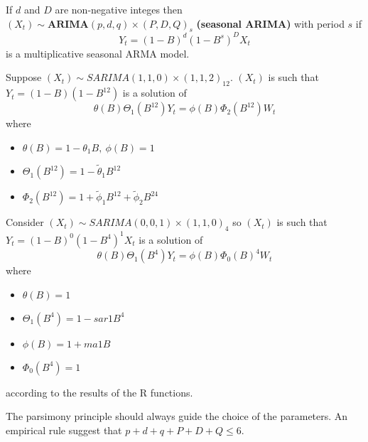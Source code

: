 \begin{definition}
    If $d$ and $D$ are non-negative integes then $(X_t)\sim\textbf{ARIMA}(p,d,q)\times(P,D,Q)_s$ \textbf{(seasonal ARIMA)} with period $s$ if
    \[
        Y_t=(1-B)^d(1-B^s)^DX_t  
    \]
    is a multiplicative seasonal ARMA model.
\end{definition}

\begin{example}
    Suppose $(X_t)\sim SARIMA(1,1,0)\times(1,1,2)_{12}$. $(X_t)$ is such that $Y_t=(1-B)(1-B^{12})$ is a solution of
    \[
        \theta(B)\Theta_1(B^{12})Y_t=\phi(B)\Phi_2(B^12)W_t  
    \]
    where
    \begin{itemize}
        \item $\theta(B)=1-\theta_1B,\ \phi(B)=1$
        \item $\Theta_1(B^{12})=1-\tilde{\theta}_1B^{12}$
        \item $\Phi_2(B^{12})=1+\tilde{\phi}_1B^{12}+\tilde{\phi}_2B^{24}$
    \end{itemize}
\end{example}

\begin{example}
    Consider $(X_t)\sim SARIMA(0,0,1)\times(1,1,0)_4$ so $(X_t)$ is such that $Y_t=(1-B)^0(1-B^4)^1X_t$ is a solution of
    \[
        \theta(B)\Theta_1(B^4)Y_t=\phi(B)\Phi_0(B)^4W_t
    \]
    where
    \begin{itemize}
        \item $\theta(B)=1$
        \item $\Theta_1(B^4)=1-sar1B^4$
        \item $\phi(B)=1+ma1B$
        \item $\Phi_0(B^4)=1$
    \end{itemize}
    according to the results of the R functions.
\end{example}

\begin{remark}
    The parsimony principle should always guide the choice of the parameters. An empirical rule suggest that $p+d+q+P+D+Q\le6$.
\end{remark}